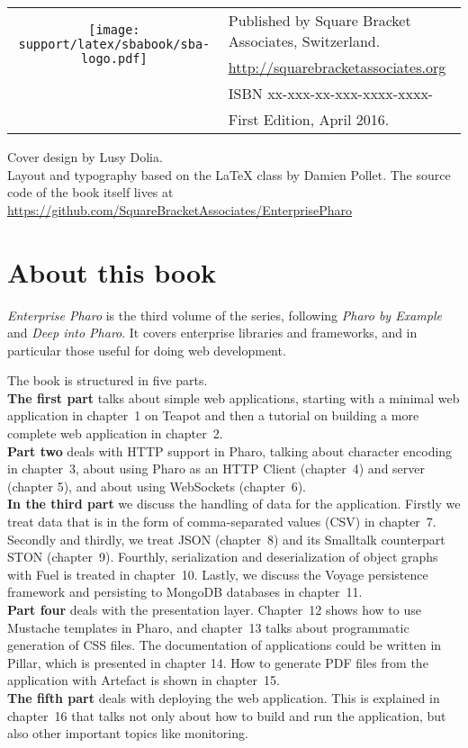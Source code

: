 \documentclass[10pt,twoside,english]{support/latex/sbabook/sbabook}
\begin{document}
{  \vfill

  \begin{tabular}{@{}c@{\quad}l}
    \multirow{2}{*}{\texttt{[image: support/latex/sbabook/sba-logo.pdf]}}
    & Published by Square Bracket Associates, Switzerland. \\
    & \url{http://squarebracketassociates.org} \\[\smallskipamount]
    & ISBN xx-xxx-xx-xxx-xxxx-xxxx- \\
    & First Edition, April 2016. \\
  \end{tabular}
  \medskip

  Cover design by Lusy Dolia. \\
  Layout and typography based on the  \LaTeX{} class by Damien Pollet.
  The source code of the book itself lives at
  \url{https://github.com/SquareBracketAssociates/EnterprisePharo}
}


\frontmatter
\pagestyle{plain}


\chapter*{About this book}

\emph{Enterprise Pharo} is the third volume of the series, following
\emph{Pharo by Example} and \emph{Deep into Pharo}. It covers
enterprise libraries and frameworks, and in particular those useful for
doing web development.

The book is structured in five parts.\\
\textbf{The first part} talks about simple web applications, starting
with a minimal web application in chapter~1 on Teapot and then a
tutorial on building a more complete web application in chapter~2.\\
\textbf{Part two} deals with HTTP support in Pharo,
talking about character encoding in chapter~3, about using Pharo as an
HTTP Client (chapter~4) and server (chapter 5), and about using
WebSockets (chapter~6).\\
\textbf{In the third part} we discuss the handling of data for the application.
Firstly we treat data that is in the form of comma-separated values (CSV) in
chapter~7. Secondly and thirdly, we treat JSON (chapter~8) and its Smalltalk
counterpart STON (chapter~9). Fourthly, serialization and deserialization of
object graphs with Fuel is treated in chapter~10. Lastly, we discuss the Voyage
persistence framework and persisting to MongoDB databases in chapter~11.\\
\textbf{Part four} deals with the presentation layer. Chapter~12 shows how to
use Mustache templates in Pharo, and chapter~13 talks about programmatic
generation of CSS files. The documentation of applications could be written in
Pillar, which is presented in chapter 14. How to generate PDF files from the
application with Artefact is shown in chapter~15.\\
\textbf{The fifth part} deals with deploying the web application. This is
explained in chapter~16 that talks not only about how to build and run the
application, but also other important topics like monitoring.
\end{document}
